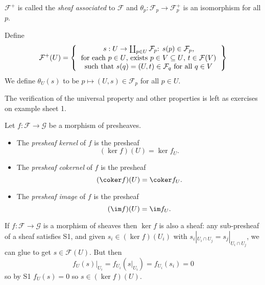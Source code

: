 \documentclass[a4paper]{article}
\newcommand{\sh}[1]{\mathcal{#1}} %
\begin{document}
\(\sh F^+\) is called the \emph{sheaf associated} to \(\sh F\) and \(\theta_p: \sh F_p \to \sh F_p^+\) is an isomorphism for all \(p\).

Define
\[
  \sh F^+(U) =
  \left\{
    \begin{tabular}{c}
      \(s: U \to \coprod_{p \in U} \sh F_p\): \(s(p) \in \sh F_p\), \\
      for each \(p\in U\), exists \(p \in V \subseteq U\), \(t \in \sh F(V)\) \\
      such that \(s(q) = (U, t) \in \sh F_q\) for all \(q \in V\)
    \end{tabular}
  \right\}
\]
We define \(\theta_U(s)\) to be \(p \mapsto (U, s) \in \sh F_p\) for all \(p \in U\).

The verification of the universal property and other properties is left as exercises on example sheet 1.

\begin{definition}
  Let \(f: \sh F \to \sh G\) be a morphism of presheaves.
  \begin{itemize}
  \item The \emph{presheaf kernel} of \(f\) is the presheaf
    \[
      (\ker f)(U) = \ker f_U.
    \]
  \item The \emph{presheaf cokernel} of \(f\) is the presheaf
    \[
      (\coker f)(U) = \coker f_U.
    \]
  \item The \emph{presheaf image} of \(f\) is the presheaf
    \[
      (\im f)(U) = \im f_U.
    \]
  \end{itemize}
\end{definition}

\begin{remark}
  If \(f: \sh F \to \sh G\) is a morphism of sheaves then \(\ker f\) is also a sheaf: any sub-presheaf of a sheaf satisfies S1, and given \(s_i \in (\ker f)(U_i)\) with \(s_i|_{U_i \cap U_j} = s_j|_{U_i \cap U_j}\), we can glue to get \(s \in \sh F(U)\). But then
  \[
    f_U(s)|_{U_i} = f_{U_i}(s|_{U_i}) = f_{U_i}(s_i) = 0
  \]
  so by S1 \(f_U(s) = 0\) so \(s \in (\ker f)(U)\).
\end{remark}
\end{document}
